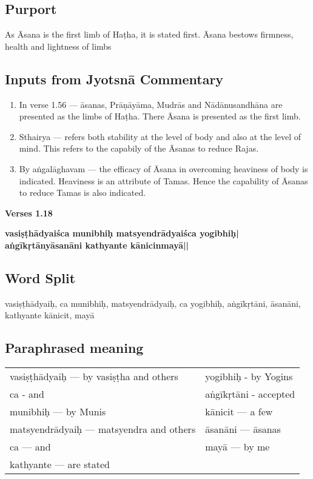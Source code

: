 \subsection*{Purport}


As Āsana is the first limb of Haṭha, it is stated first. Āsana bestows firmness, health and lightness of limbs

\subsection*{Inputs from Jyotsnā Commentary}

\begin{enumerate}
\item In verse 1.56 --- āsanas, Prāṇāyāma, Mudrās and Nādānusandhāna are presented as the limbs of Haṭha. There Āsana is presented as the first limb. 
\item Sthairya --- refers both stability at the level of body and also at the level of mind. This refers to the capabily of the Āsanas to reduce Rajas.
\item By aṅgalāghavam --- the efficacy of Āsana in overcoming heaviness of body is indicated. Heaviness is an attribute of Tamas. Hence the capability of Āsanas to reduce Tamas is also indicated. 
\end{enumerate}

\newpage
\noindent \textbf{Verses 1.18}

\begin{shloka}
\textbf{vasiṣṭhādyaiśca munibhiḥ matsyendrādyaiśca yogibhiḥ|}\\
\textbf{aṅgīkṛtānyāsanāni kathyante kānicinmayā||}
\end{shloka}


\subsection*{Word Split}

vasiṣṭhādyaiḥ, ca munibhiḥ, matsyendrādyaiḥ, ca yogibhiḥ, aṅgīkṛtāni, āsanāni, kathyante kānicit, mayā

\subsection*{Paraphrased meaning}

\begin{longtable}{>{\noindent\raggedright}p{5cm}>{\noindent\raggedright}p{5cm}}
vasiṣṭhādyaiḥ --- by vasiṣṭha and others & yogibhiḥ - by Yogins\tabularnewline
ca - and & aṅgīkṛtāni  - accepted\tabularnewline
munibhiḥ  --- by Munis & kānicit --- a few\tabularnewline
matsyendrādyaiḥ --- matsyendra and others & āsanāni --- āsanas\tabularnewline
ca  --- and & mayā --- by me\tabularnewline
kathyante --- are stated & 
\end{longtable}

